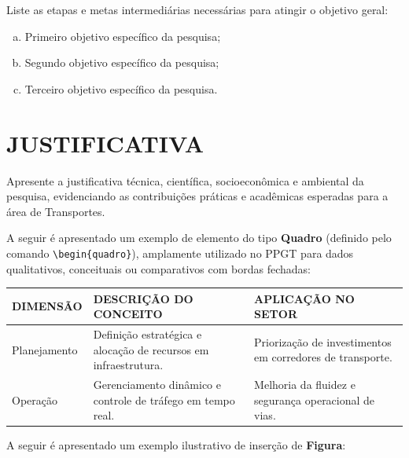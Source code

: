 Liste as etapas e metas intermediárias necessárias para atingir o objetivo geral:
\begin{enumerate}[(a)]
  \item Primeiro objetivo específico da pesquisa;
  \item Segundo objetivo específico da pesquisa;
  \item Terceiro objetivo específico da pesquisa.
\end{enumerate}

\section{JUSTIFICATIVA}
\label{sec:justificativa}

Apresente a justificativa técnica, científica, socioeconômica e ambiental da pesquisa, evidenciando as contribuições práticas e acadêmicas esperadas para a área de Transportes.

A seguir é apresentado um exemplo de elemento do tipo \textbf{Quadro} (definido pelo comando \texttt{\textbackslash begin\{quadro\}}), amplamente utilizado no PPGT para dados qualitativos, conceituais ou comparativos com bordas fechadas:

\begin{quadro}[htbp]
  \caption{Exemplo de quadro estruturado segundo as normas do PPGT}
  \label{quad:exemplo_quadro}
  \centering
  \small
  \begin{tabular}{|p{3cm}|p{6cm}|p{4.5cm}|}
    \hline
    \textbf{DIMENSÃO} & \textbf{DESCRIÇÃO DO CONCEITO} & \textbf{APLICAÇÃO NO SETOR} \\
    \hline
    Planejamento & Definição estratégica e alocação de recursos em infraestrutura. & Priorização de investimentos em corredores de transporte. \\
    \hline
    Operação & Gerenciamento dinâmico e controle de tráfego em tempo real. & Melhoria da fluidez e segurança operacional de vias. \\
    \hline
  \end{tabular}
\end{quadro}

A seguir é apresentado um exemplo ilustrativo de inserção de \textbf{Figura}:

